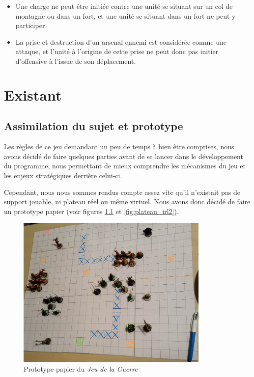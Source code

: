 \documentclass[a4paper]{report}
\begin{document}
\begin{itemize}
        \item Une charge ne peut être initiée contre une unité se situant sur un col de montagne ou dans un fort, et une unité se situant dans un fort ne peut y participer.
        \item La prise et destruction d'un arsenal ennemi est considérée comme une attaque, et l'unité à l'origine de cette prise ne peut donc pas initier d'offensive à l'issue de son déplacement.
    \end{itemize}


\chapter{Existant}
\section{Assimilation du sujet et prototype}

Les règles de ce jeu demandant un peu de temps à bien être comprises, nous avons décidé de faire quelques parties avant de se lancer dans le développement du programme, nous permettant de mieux comprendre les mécanismes du jeu et les enjeux stratégiques derrière celui-ci.

Cependant, nous nous sommes rendus compte assez vite qu'il n'existait pas de support jouable, ni plateau réel ou même virtuel. Nous avons donc décidé de faire un prototype papier (voir figures \ref{fig:plateau_irl} et \ref{fig:plateau_irl2}).


\begin{figure}[h]
\centering
\includegraphics[width=0.84\textwidth]{existantPlateau/plateau2}
\caption{Prototype papier du {\it Jeu de la Guerre}}\label{fig:plateau_irl}
\end{figure}
\end{document}
